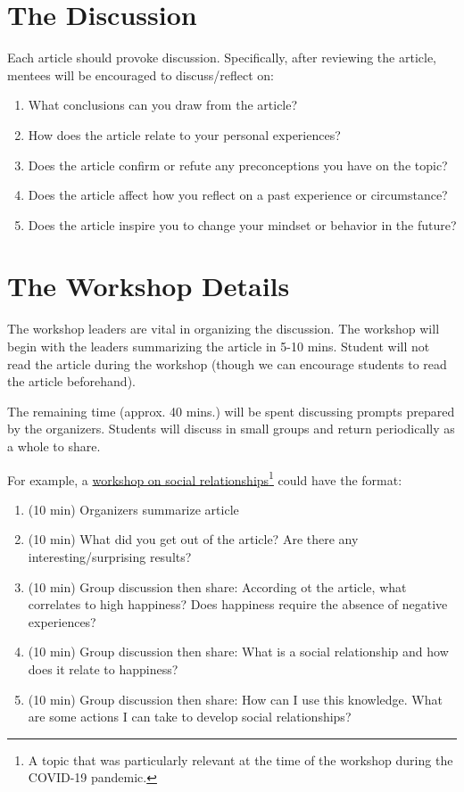 \documentclass[addpoints,12pt]{exam}
\numberwithin{equation}{section}
\begin{document}
	\section{The Discussion}
	
	Each article should provoke discussion. Specifically, after reviewing the article, mentees will be encouraged to discuss/reflect on:
	\begin{enumerate}
		\item What conclusions can you draw from the article?
		\item How does the article relate to your personal experiences?
		\item Does the article confirm or refute any preconceptions you have on the topic?
		\item Does the article affect how you reflect on a past experience or circumstance?
		\item Does the article inspire you to change your mindset or behavior in the future?
	\end{enumerate}
	
	\section{The Workshop Details}
	
	The workshop leaders are vital in organizing the discussion. The workshop will begin with the leaders summarizing the article in 5-10 mins. Student will not read the article during the workshop (though we can encourage students to read the article beforehand). 
	
	The remaining time (approx. 40 mins.) will be spent discussing prompts prepared by the organizers. Students will discuss in small groups and return periodically as a whole to share.
	
	For example, a \href{https://docs.google.com/presentation/d/1po6mHtTGYhum0Xzs9pDQst9OSHkqu6Ol0Sbehd4gqHk/edit?usp=sharing}{workshop on social relationships}\footnote{A topic that was particularly relevant at the time of the workshop during the COVID-19 pandemic.} could have the format:
	\begin{enumerate}
		\item (10 min) Organizers summarize article
		\item (10 min) What did you get out of the article? Are there any interesting/surprising results?
		\item (10 min) Group discussion then share: According ot the article, what correlates to high happiness? Does happiness require the absence of negative experiences?
		\item (10 min) Group discussion then share: What is a social relationship and how does it relate to happiness?
		\item (10 min) Group discussion then share: How can I use this knowledge. What are some actions I can take to develop social relationships?
	\end{enumerate}
	
\end{document}
